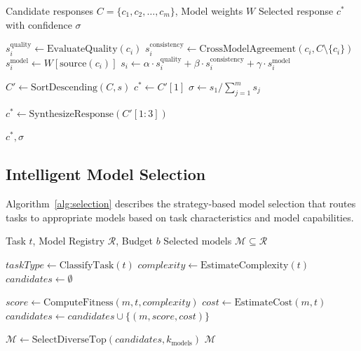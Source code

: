 \begin{algorithm}[!ht]
\caption{Weighted Consensus Evaluation}
\label{alg:consensus}
\begin{algorithmic}[1]
\Require Candidate responses $C = \{c_1, c_2, \ldots, c_m\}$, Model weights $W$
\Ensure Selected response $c^*$ with confidence $\sigma$

    \State $s_i^{\text{quality}} \gets \text{EvaluateQuality}(c_i)$
    \State $s_i^{\text{consistency}} \gets \text{CrossModelAgreement}(c_i, C \setminus \{c_i\})$
    \State $s_i^{\text{model}} \gets W[\text{source}(c_i)]$ 
    \State $s_i \gets \alpha \cdot s_i^{\text{quality}} + \beta \cdot s_i^{\text{consistency}} + \gamma \cdot s_i^{\text{model}}$
\EndFor

\State $C' \gets \text{SortDescending}(C, s)$
\State $c^* \gets C'[1]$ 
\State $\sigma \gets s_1 / \sum_{j=1}^{m} s_j$ 

\If{$\sigma < \theta_{\min}$} 
    \State $c^* \gets \text{SynthesizeResponse}(C'[1:3])$ 
\EndIf

\State \Return $c^*, \sigma$
\end{algorithmic}
\end{algorithm}

\subsection{Intelligent Model Selection}

Algorithm~\ref{alg:selection} describes the strategy-based model selection that routes tasks to appropriate models based on task characteristics and model capabilities.

\begin{algorithm}[!ht]
\caption{Strategy-Based Model Selection}
\label{alg:selection}
\begin{algorithmic}[1]
\Require Task $t$, Model Registry $\mathcal{R}$, Budget $b$
\Ensure Selected models $\mathcal{M} \subseteq \mathcal{R}$

\State $taskType \gets \text{ClassifyTask}(t)$
\State $complexity \gets \text{EstimateComplexity}(t)$
\State $candidates \gets \emptyset$

        \State $score \gets \text{ComputeFitness}(m, t, complexity)$
        \State $cost \gets \text{EstimateCost}(m, t)$
            \State $candidates \gets candidates \cup \{(m, score, cost)\}$
        \EndIf
    \EndIf
\EndFor

\State $\mathcal{M} \gets \text{SelectDiverseTop}(candidates, k_{\text{models}})$
\State \Return $\mathcal{M}$
\end{algorithmic}
\end{algorithm}

